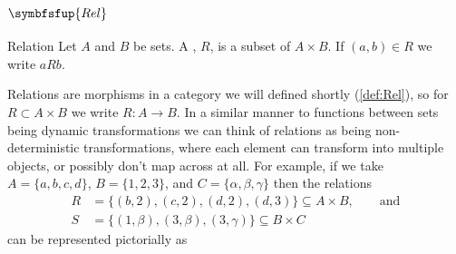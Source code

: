 \documentclass[fleqn]{NotesClass}
\makeatletter
\newcommand{\c@egory}[1]{\symbfsfup{#1}}
\newcommand{\Rel}{\c@egory{Rel}}
\makeatother
\begin{document}
    \subsection{\texorpdfstring{\(\Rel\)}{Rel}}
    \begin{dfn}{Relation}{}
        Let \(A\) and \(B\) be sets.
        A , \(R\), is a subset of \(A \times B\).
        If \((a, b) \in R\) we write \(a R b\).
    \end{dfn}
    Relations are morphisms in a category we will defined shortly (\cref{def:Rel}), so for \(R \subset A \times B\) we write \(R \colon A \to B\).
    In a similar manner to functions between sets being dynamic transformations we can think of relations as being non-deterministic transformations, where each element can transform into multiple objects, or possibly don't map across at all.
    For example, if we take \(A = \{a, b, c, d\}\), \(B = \{1, 2, 3\}\), and \(C = \{\alpha, \beta, \gamma\}\) then the relations
    \begin{align}
        R &= \{(b, 2), (c, 2), (d, 2), (d, 3)\} \subseteq A \times B, \qquad \text{and}\\
        S &= \{(1, \beta), (3, \beta), (3, \gamma)\} \subseteq B \times C
    \end{align}
    can be represented pictorially as
\end{document}
